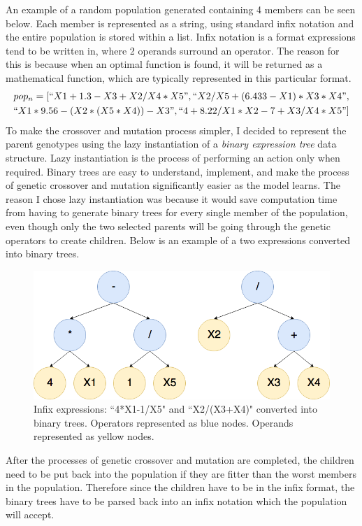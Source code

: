 \documentclass[11pt]{article}
\begin{document}
An example of a random population generated containing 4 members can be seen below. Each member is represented as a string, using standard infix notation and the entire population is stored within a list. Infix notation is a format expressions tend to be written in, where 2 operands surround an operator. The reason for this is because when an optimal function is found, it will be returned as a mathematical function, which are typically represented in this particular format. 
\begin{align*}
pop_n = [``X1+1.3-X3+X2/X4*X5" ,``X2/X5+(6.433-X1)*X3*X4", \\
``X1*9.56-(X2*(X5*X4))-X3", ``4+8.22/X1*X2-7+X3/X4*X5"] 
\end{align*}
To make the crossover and mutation process simpler, I decided to represent the parent genotypes using the lazy instantiation of a \textit{binary expression tree} data structure. Lazy instantiation is the process of performing an action only when required. Binary trees are easy to understand, implement, and make the process of genetic crossover and mutation significantly easier as the model learns. The reason I chose lazy instantiation was because it would save computation time from having to generate binary trees for every single member of the population, even though only the two selected parents will be going through the genetic operators to create children. Below is an example of a two expressions converted into binary trees. 
\begin{figure}[h]
\centering
\includegraphics[scale = .30]{binaryT}
\caption{Infix expressions: ``4*X1-1/X5" and ``X2/(X3+X4)" converted into binary trees. Operators represented as blue nodes. Operands represented as yellow nodes. } 
\end{figure}
After the processes of genetic crossover and mutation are completed, the children need to be put back into the population if they are fitter than the worst members in the population. Therefore since the children have to be in the infix format, the binary trees have to be parsed back into an infix notation which the population will accept. 
\end{document}
